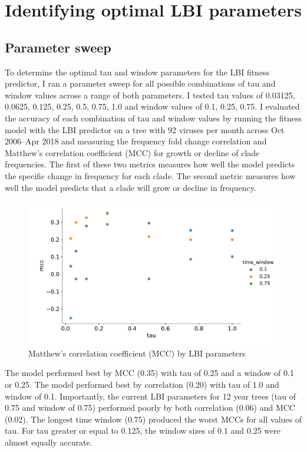 \documentclass[12pt]{article}
\begin{document}
\section{Identifying optimal LBI parameters}

\subsection{Parameter sweep}

To determine the optimal tau and window parameters for the LBI fitness predictor, I ran a parameter sweep for all possible combinations of tau and window values across a range of both parameters.
I tested tau values of 0.03125, 0.0625, 0.125, 0.25, 0.5, 0.75, 1.0 and window values of 0.1, 0.25, 0.75.
I evaluated the accuracy of each combination of tau and window values by running the fitness model with the LBI predictor on a tree with 92 viruses per month across Oct 2006--Apr 2018 and measuring the frequency fold change correlation and Matthew's correlation coefficient (MCC) for growth or decline of clade frequencies.
The first of these two metrics measures how well the model predicts the specific change in frequency for each clade.
The second metric measures how well the model predicts that a clade will grow or decline in frequency.

\begin{figure}[h]
\includegraphics[width=5in]{mcc_by_lbi_parameters.pdf}
\caption{Matthew's correlation coefficient (MCC) by LBI parameters}
\label{mcc-by-lbi-parameters}
\end{figure}

The model performed best by MCC (0.35) with tau of 0.25 and a window of 0.1 or 0.25.
The model performed best by correlation (0.20) with tau of 1.0 and window of 0.1.
Importantly, the current LBI parameters for 12 year trees (tau of 0.75 and window of 0.75) performed poorly by both correlation (0.06) and MCC (0.02).
The longest time window (0.75) produced the worst MCCs for all values of tau.
For tau greater or equal to 0.125, the window sizes of 0.1 and 0.25 were almost equally accurate.
\end{document}

